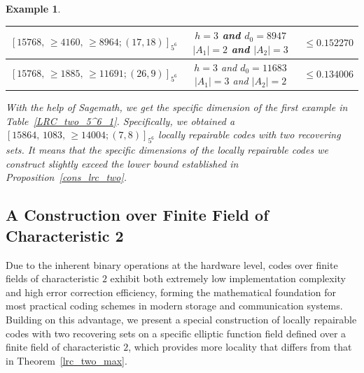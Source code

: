 \documentclass[journal,12pt,onecolumn]{IEEEtran}
\newtheorem{example}{Example}
\begin{document}
\begin{example}
\begin{table}[ht]
\begin{tabular}{|c|c|c|}
		\([15768,\,\ge4160,\,\ge 8964;(17,18)]_{5^6}\) & \makecell{\(h = 3\) and \(d_0 = 8947\) \\ \(|A_1| = 2\) and \(|A_2| = 3\)} & \(\le 0.152270\) \\
        \midrule[0.5pt]

        \([15768,\,\ge 1885,\,\ge 11691;(26,9)]_{5^6}\) & \makecell{\(h = 3\) and \(d_0 = 11683\) \\ \(|A_1| = 3\) and \(|A_2| = 2\)} & \(\le 0.134006\) \\
        
        \bottomrule[1.2pt]
	\end{tabular}
	\label{LRC_two_5^6_2}
    \end{table}

    With the help of Sagemath, we get the specific dimension of the first example in Table~\ref{LRC_two_5^6_1}. Specifically, we obtained a \([15864,\,1083,\,\ge 14004;(7,8)]_{5^6}\) locally repairable codes with two recovering sets. It means that the specific dimensions of the locally repairable codes we construct slightly exceed the lower bound established in Proposition~\ref{cons_lrc_two}. 
\end{example}


\subsection{A Construction over Finite Field of Characteristic 2}

Due to the inherent binary operations at the hardware level, codes over finite fields of characteristic \(2\) exhibit both extremely low implementation complexity and high error correction efficiency, forming the mathematical foundation for most practical coding schemes in modern storage and communication systems. Building on this advantage, we present a special construction of locally repairable codes with two recovering sets on a specific elliptic function field defined over a finite field of characteristic \(2\), which provides more locality that differs from that in Theorem~\ref{lrc_two_max}. 
\end{document}
